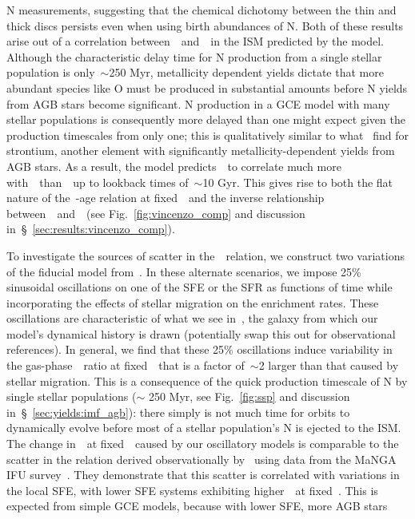\documentclass[ms.tex]{subfiles}
\begin{document}
N measurements, suggesting that the chemical dichotomy between the thin and
thick discs persists even when using birth abundances of N.
Both of these results arise out of a correlation between~\nh~and~\feh~in the
ISM predicted by the model.
Although the characteristic delay time for N production from a single stellar
population is only~$\sim$250 Myr, metallicity dependent yields dictate that
more abundant species like O must be produced in substantial amounts before N
yields from AGB stars become significant.
N production in a GCE model with many stellar populations is consequently more
delayed than one might expect given the production timescales from only one;
this is qualitatively similar to what~\citet{Johnson2020} find for strontium,
another element with significantly metallicity-dependent yields from AGB stars.
As a result, the model predicts~\nh~to correlate much more with~\feh~than~\oh~up
to lookback times of~$\sim$10 Gyr.
This gives rise to both the flat nature of the~\no-age relation at
fixed~\feh~and the inverse relationship between~\no~and~\ofe~(see
Fig.~\ref{fig:vincenzo_comp} and discussion
in~\S~\ref{sec:results:vincenzo_comp}).
\par
To investigate the sources of scatter in the~\ohno~relation, we construct two
variations of the fiducial model from~\citet{Johnson2021}.
In these alternate scenarios, we impose 25\% sinusoidal oscillations on one of
the SFE or the SFR as functions of time while incorporating the effects of
stellar migration on the enrichment rates.
{\color{red}
These oscillations are characteristic of what we see in~\hsim, the galaxy from
which our model's dynamical history is drawn (potentially swap this out for
observational references).
}
In general, we find that these 25\% oscillations induce variability in the
gas-phase~\no~ratio at fixed~\oh~that is a factor of~$\sim$2 larger than that
caused by stellar migration.
This is a consequence of the quick production timescale of N by single stellar
populations ($\sim$ 250 Myr, see Fig.~\ref{fig:ssp} and discussion
in~\S~\ref{sec:yields:imf_agb}): there simply is not much time for orbits to
dynamically evolve before most of a stellar population's N is ejected to the
ISM.
The change in~\no~at fixed~\oh~caused by our oscillatory models is comparable
to the scatter in the relation derived observationally by~\citet{Schaefer2020}
using data from the MaNGA IFU survey~\citep{Bundy2015}.
They demonstrate that this scatter is correlated with variations in the local
SFE, with lower SFE systems exhibiting higher~\no~at fixed~\oh.
This is expected from simple GCE models, because with lower SFE, more AGB stars
\end{document}
